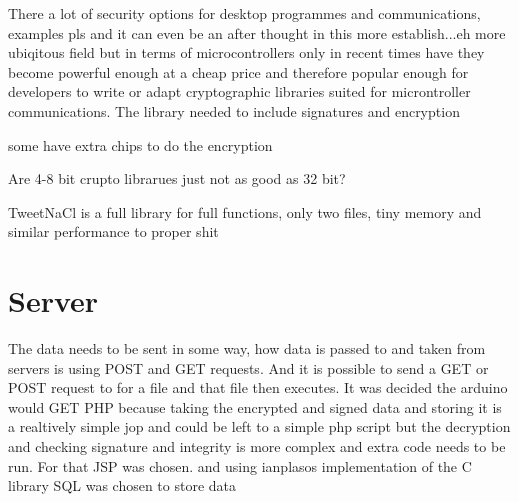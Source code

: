 There a lot of security options for desktop programmes and communications, examples pls and it can even be an after thought in this more establish...eh more ubiqitous field but in terms of microcontrollers only in recent times have they become powerful enough at a cheap price and therefore popular enough for developers to write or adapt cryptographic libraries suited for microntroller communications. The library needed to include signatures and encryption

some have extra chips to do the encryption

Are 4-8 bit crupto librarues just not as good as 32 bit?

TweetNaCl is a full library for full functions, only two files, tiny memory and similar performance to proper shit


\section{Server}

The data needs to be sent in some way, how data is passed to and taken from servers is using POST and GET requests. And it is possible to send a GET or POST request to for a file and that file then executes. It was decided the arduino would GET PHP because taking the encrypted and signed data and storing it is a realtively simple jop and could be left to a simple php script but the decryption and checking signature and integrity is more complex and extra code needs to be run. For that JSP was chosen.
and using ianplasos implementation of the C library
SQL was chosen to store data